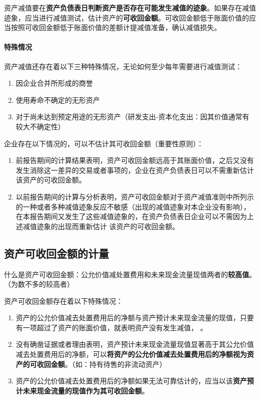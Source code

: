 \documentclass[UTF8,12pt]{ctexart}
\numberwithin{equation}{section} %
\numberwithin{figure}{section}
\numberwithin{table}{section}
\begin{document}
	资产减值要在\textbf{资产负债表日判断资产是否存在可能发生减值的迹象}。如果存在减值迹象，应当进行减值测试，估计资产的\textbf{可收回金额}。可收回金额低于账面价值的应当按照可收回金额低于账面价值的差额计提减值准备，确认减值损失。
	
	\paragraph{特殊情况}资产减值还存在着以下三种特殊情况，无论如何至少每年需要进行减值测试：
	\begin{enumerate}
		\item 因企业合并所形成的商誉
		
		\item 使用寿命不确定的无形资产
		
		\item 对于尚未达到预定用途的无形资产（研发支出-资本化支出：因其价值通常有较大不确定性）
	\end{enumerate}
	
	企业存在以下情况的，可以不估计其可收回金额（重要性原则）：
	\begin{enumerate}
		\item 前报告期间的计算结果表明，资产可收回金额远高于其账面价值，之后又没有发生消除这一差异的交易或者事项的，企业在资产负债表日可以不需重新估计该资产的可收回金额。
		\item 以前报告期间的计算与分析表明，资产可收回金额对于资产减值准则中所列示的一种或者多种减值迹象反应不敏感（出现的减值迹象对本企业没有影响），在本报告期间又发生了这些减值迹象的，在资产负债表日企业可以不需因为上述减值迹象的出现而重新估计  该资产的可收回金额。
	\end{enumerate}
	
	\subsection{资产可收回金额的计量}
	什么是资产可收回金额：公允价值减处置费用和未来现金流量现值两者的\textbf{较高值}。（为数不多的较高者）
	
	资产可收回金额存在着以下特殊情况：
	\begin{enumerate}
		\item 资产的公允价值减去处置费用后的净额与资产预计未来现金流量的现值，只要有一项超过了资产的账面价值，就表明资产没有发生减值，\textbf{ }。
		\item 没有确凿证据或者理由表明，资产预计未来现金流量现值显著高于其公允价值减去处置费用后的净额，可以\textbf{将资产的公允价值减去处置费用后的净额视为资产的可收回金额}。（如：持有待售的非流动资产）
		\item 资产的公允价值减去处置费用后的净额如果无法可靠估计的，应当以该\textbf{资产预计未来现金流量的现值作为其可收回金额}。
		
	\end{enumerate}
	
\end{document}
